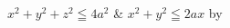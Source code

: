 \documentclass[dvipdfmx,papersize]{jsarticle}
\begin{document}
\hspace{-5.5zw}
$x^2+y^2+z^2\leqq 4a^2$ \& $x^2+y^2\leqq 2ax$ by \ketcindy
\vspace{5mm}

\begin{layerv}[25]{-10}{0}
\end{layerv}
\end{document}
